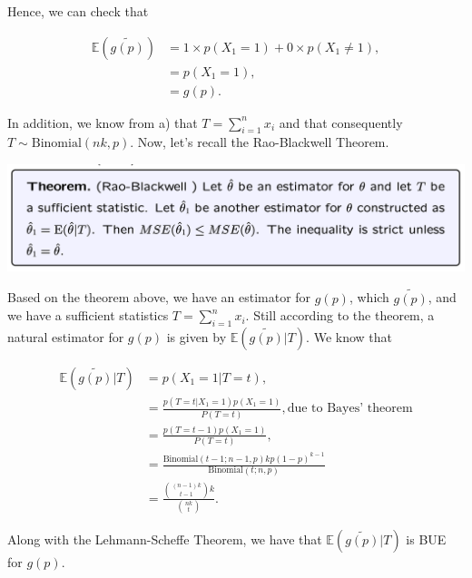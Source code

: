 \documentclass[12pt]{article}
\begin{document}
Hence, we can check that 

\begin{align}
\mathbb{E}(\tilde{g(p)}) & = 1 \times p(X_{1}=1) + 0 \times p(X_{1} \ne 1), \\
& = p(X_{1}=1), \\ 
& = g(p).
\end{align}

In addition, we know from a) that $T = \sum_{i=1}^{n} x_{i}$ and that consequently $T \sim \mbox{Binomial}(nk, p)$. Now, let's recall the Rao-Blackwell Theorem.

\includegraphics[width=1\linewidth]{rao_blackwell.png}

Based on the theorem above, we have an estimator for $g(p)$, which $\tilde{g(p)}$, and we have a sufficient statistics $T = \sum_{i=1}^{n}x_{i}$. Still according to the theorem, a natural estimator for $g(p)$ is given by $\mathbb{E}(\tilde{g(p)}|T)$. We know that

\begin{align}
\mathbb{E}(\tilde{g(p)}|T) & = p(X_{1} = 1| T = t), \\
& = \frac{p(T = t|X_{1} = 1) p(X_{1} = 1)}{P(T=t)}, \mbox{due to Bayes' theorem} \\
& = \frac{p(T = t - 1) p(X_{1} = 1)}{P(T=t)}, \\
& = \frac{\mbox{Binomial}(t-1; n-1, p) kp(1-p)^{k-1}}{\mbox{Binomial}(t; n, p)} \\
& = \frac{{(n-1)k \choose t-1} k}{{nk \choose t}}.
\end{align}

Along with the Lehmann-Scheffe Theorem, we have that $\mathbb{E}(\tilde{g(p)}|T)$ is BUE for $g(p)$.
\end{document}
